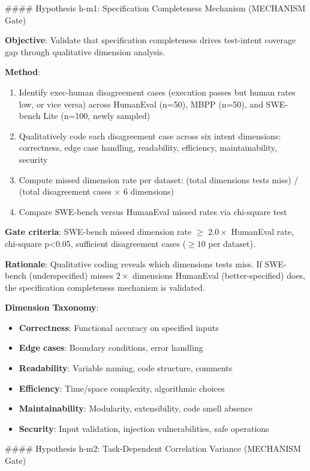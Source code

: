 \#\#\#\# Hypothesis h-m1: Specification Completeness Mechanism (MECHANISM Gate)

\textbf{Objective}: Validate that specification completeness drives test-intent coverage gap through qualitative dimension analysis.

\textbf{Method}:
\begin{enumerate}
\item Identify exec-human disagreement cases (execution passes but human rates low, or vice versa) across HumanEval (n=50), MBPP (n=50), and SWE-bench Lite (n=100, newly sampled)
\item Qualitatively code each disagreement case across six intent dimensions: correctness, edge case handling, readability, efficiency, maintainability, security
\item Compute missed dimension rate per dataset: (total dimensions tests miss) / (total disagreement cases $\times$ 6 dimensions)
\item Compare SWE-bench versus HumanEval missed rates via chi-square test
\end{enumerate}

\textbf{Gate criteria}: SWE-bench missed dimension rate $\geq$ 2.$0\times$ HumanEval rate, chi-square p<0.05, sufficient disagreement cases ($\geq 10$ per dataset).

\textbf{Rationale}: Qualitative coding reveals which dimensions tests miss. If SWE-bench (underspecified) misses $2\times$ dimensions HumanEval (better-specified) does, the specification completeness mechanism is validated.

\textbf{Dimension Taxonomy}:
\begin{itemize}
\item \textbf{Correctness}: Functional accuracy on specified inputs
\item \textbf{Edge cases}: Boundary conditions, error handling
\item \textbf{Readability}: Variable naming, code structure, comments
\item \textbf{Efficiency}: Time/space complexity, algorithmic choices
\item \textbf{Maintainability}: Modularity, extensibility, code smell absence
\item \textbf{Security}: Input validation, injection vulnerabilities, safe operations
\end{itemize}

\#\#\#\# Hypothesis h-m2: Task-Dependent Correlation Variance (MECHANISM Gate)

